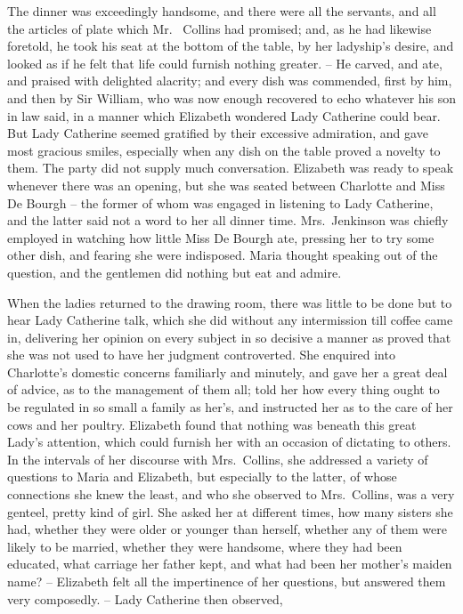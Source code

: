 The dinner was exceedingly handsome, and there were
all the servants, and all the articles of plate which Mr.\ %
Collins had promised; and, as he had likewise foretold,
he took his seat at the bottom of the table, by her ladyship’s
desire, and looked as if he felt that life could furnish
nothing greater. -- He carved, and ate, and praised with
delighted alacrity; and every dish was commended, first
by him, and then by Sir William, who was now enough
recovered to echo whatever his son in law said, in a manner
which Elizabeth wondered Lady Catherine could bear.
But Lady Catherine seemed gratified by their excessive
admiration, and gave most gracious smiles, especially when
any dish on the table proved a novelty to them. The
party did not supply much conversation. Elizabeth was
ready to speak whenever there was an opening, but she
was seated between Charlotte and Miss De Bourgh -- the
former of whom was engaged in listening to Lady Catherine,
and the latter said not a word to her all dinner time.
Mrs.\ Jenkinson was chiefly employed in watching how
little Miss De Bourgh ate, pressing her to try some other
dish, and fearing she were indisposed. Maria thought
speaking out of the question, and the gentlemen did
nothing but eat and admire.

When the ladies returned to the drawing room, there
was little to be done but to hear Lady Catherine talk,
which she did without any intermission till coffee came
in, delivering her opinion on every subject in so decisive
a manner as proved that she was not used to have her
judgment controverted. She enquired into Charlotte’s
domestic concerns familiarly and minutely, and gave her
a great deal of advice, as to the management of them all;
told her how every thing ought to be regulated in so
small a family as her’s, and instructed her as to the care
of her cows and her poultry. Elizabeth found that
nothing was beneath this great Lady’s attention, which
could furnish her with an occasion of dictating to others.
In the intervals of her discourse with Mrs.\ Collins, she
addressed a variety of questions to Maria and Elizabeth,
but especially to the latter, of whose connections she knew
the least, and who she observed to Mrs.\ Collins, was a very
genteel, pretty kind of girl. She asked her at different
times, how many sisters she had, whether they were older
or younger than herself, whether any of them were likely
to be married, whether they were handsome, where they
had been educated, what carriage her father kept, and what
had been her mother’s maiden name? -- Elizabeth felt all
the impertinence of her questions, but answered them very
composedly. -- Lady Catherine then observed,

